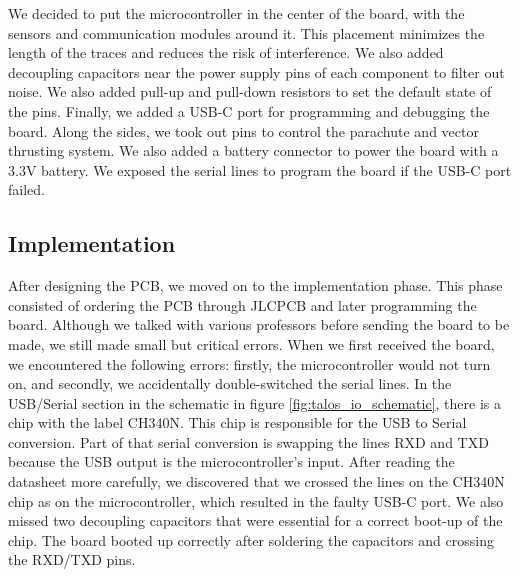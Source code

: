 \documentclass{article}
\begin{document}
We decided to put the microcontroller in the center of the board, with the sensors and communication modules around it. This placement minimizes the length of the traces and reduces the risk of interference. We also added decoupling capacitors near the power supply pins of each component to filter out noise. We also added pull-up and pull-down resistors to set the default state of the pins. Finally, we added a USB-C port for programming and debugging the board. Along the sides, we took out pins to control the parachute and vector thrusting system. We also added a battery connector to power the board with a 3.3V battery. We exposed the serial lines to program the board if the USB-C port failed.

\subsection{Implementation}
After designing the PCB, we moved on to the implementation phase. This phase consisted of ordering the PCB through JLCPCB and later programming the board. Although we talked with various professors before sending the board to be made, we still made small but critical errors. When we first received the board, we encountered the following errors: firstly, the microcontroller would not turn on, and secondly, we accidentally double-switched the serial lines. In the USB/Serial section in the schematic in figure \ref{fig:talos_io_schematic}, there is a chip with the label CH340N. This chip is responsible for the USB to Serial conversion. Part of that serial conversion is swapping the lines RXD and TXD because the USB output is the microcontroller's input. After reading the datasheet more carefully, we discovered that we crossed the lines on the CH340N chip as on the microcontroller, which resulted in the faulty USB-C port. We also missed two decoupling capacitors that were essential for a correct boot-up of the chip. The board booted up correctly after soldering the capacitors and crossing the RXD/TXD pins.
\end{document}
